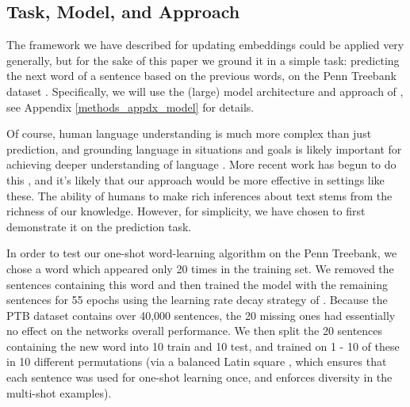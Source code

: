 \documentclass{article}
\begin{document}
\subsection{Task, Model, and Approach}
The framework we have described for updating embeddings could be applied very generally, but for the sake of this paper we ground it in a simple task: predicting the next word of a sentence based on the previous words, on the Penn Treebank dataset \citep{Marcus1993}. Specifically, we will use the (large) model architecture and approach of \citet{Zaremba2014a}, see Appendix \ref{methods_appdx_model} for details. \par
Of course, human language understanding is much more complex than just prediction, and grounding language in situations and goals is likely important for achieving deeper understanding of language \citep{Gauthier2016}. More recent work has begun to do this \citep[e.g]{Hermann2017}, and it's likely that our approach would be more effective in settings like these. The ability of humans to make rich inferences about text stems from the richness of our knowledge. However, for simplicity, we have chosen to first demonstrate it on the prediction task. \par 
In order to test our one-shot word-learning algorithm on the Penn Treebank, we chose a word which appeared only 20 times in the training set. We removed the sentences containing this word and then trained the model with the remaining sentences for 55 epochs using the learning rate decay strategy of \citet{Zaremba2014a}. Because the PTB dataset contains over 40,000 sentences, the 20 missing ones had essentially no effect on the networks overall performance. We then split the 20 sentences containing the new word into 10 train and 10 test, and trained on 1 - 10 of these in 10 different permutations (via a balanced Latin square \citep{Campbell1980}, which ensures that each sentence was used for one-shot learning once, and enforces diversity in the multi-shot examples). 
\end{document}
